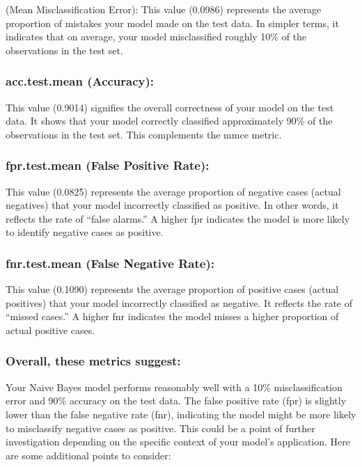\documentclass[
]{article}
\begin{document}
(Mean Misclassification Error): This value (0.0986) represents the
average proportion of mistakes your model made on the test data. In
simpler terms, it indicates that on average, your model misclassified
roughly 10\% of the observations in the test set.

\subsubsection{acc.test.mean (Accuracy):}\label{acc.test.mean-accuracy}

This value (0.9014) signifies the overall correctness of your model on
the test data. It shows that your model correctly classified
approximately 90\% of the observations in the test set. This complements
the mmce metric.

\subsubsection{fpr.test.mean (False Positive
Rate):}\label{fpr.test.mean-false-positive-rate}

This value (0.0825) represents the average proportion of negative cases
(actual negatives) that your model incorrectly classified as positive.
In other words, it reflects the rate of ``false alarms.'' A higher fpr
indicates the model is more likely to identify negative cases as
positive.

\subsubsection{fnr.test.mean (False Negative
Rate):}\label{fnr.test.mean-false-negative-rate}

This value (0.1090) represents the average proportion of positive cases
(actual positives) that your model incorrectly classified as negative.
It reflects the rate of ``missed cases.'' A higher fnr indicates the
model misses a higher proportion of actual positive cases.

\subsubsection{Overall, these metrics
suggest:}\label{overall-these-metrics-suggest}

Your Naive Bayes model performs reasonably well with a 10\%
misclassification error and 90\% accuracy on the test data. The false
positive rate (fpr) is slightly lower than the false negative rate
(fnr), indicating the model might be more likely to misclassify negative
cases as positive. This could be a point of further investigation
depending on the specific context of your model's application. Here are
some additional points to consider:
\end{document}

